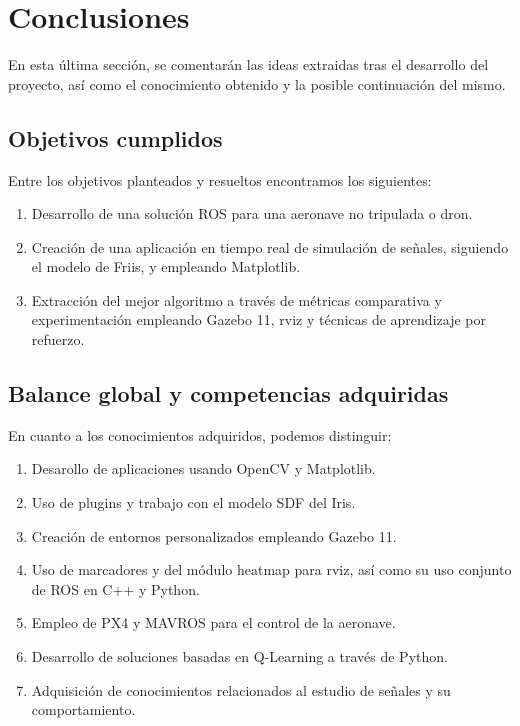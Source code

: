 \chapter{Conclusiones}
\label{cap:capitulo5}

En esta última sección, se comentarán las ideas extraidas tras el desarrollo del proyecto, así como el conocimiento obtenido y la posible continuación del mismo.\\

\section{Objetivos cumplidos}
\label{sec:objetivos_cumplidos}

Entre los objetivos planteados y resueltos encontramos los siguientes:\\

\begin{enumerate}
    \item Desarrollo de una solución \ac{ROS} para una aeronave no tripulada o dron.
    
    \item Creación de una aplicación en tiempo real de simulación de señales, siguiendo el modelo de Friis, y empleando Matplotlib.
    
    \item Extracción del mejor algoritmo a través de métricas comparativa y experimentación empleando Gazebo 11, rviz y técnicas de aprendizaje por refuerzo.
\end{enumerate}

\section{Balance global y competencias adquiridas}
\label{sec:balance_global_competencias_adquiridas}

En cuanto a los conocimientos adquiridos, podemos distinguir:\\

\begin{enumerate}
    \item Desarollo de aplicaciones usando OpenCV y Matplotlib.
    
    \item Uso de plugins y trabajo con el modelo SDF del Iris.
    
    \item Creación de entornos personalizados empleando Gazebo 11.
    
    \item Uso de marcadores y del módulo heatmap para rviz, así como su uso conjunto de ROS en C++ y Python.
    
    \item Empleo de PX4 y MAVROS para el control de la aeronave.
    
    \item Desarrollo de soluciones basadas en Q-Learning a través de Python.
    
    \item Adquisición de conocimientos relacionados al estudio de señales y su comportamiento.
\end{enumerate}

